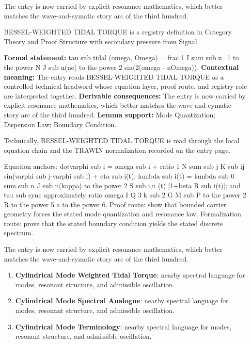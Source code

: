 The entry is now carried by explicit resonance mathematics, which better matches the wave-and-cymatic story arc of the third hundred.
\clearpage


\begingroup\small
{}
BESSEL-WEIGHTED TIDAL TORQUE is a registry definition in Category Theory and Proof Structure with secondary pressure from Signal.

\begingroup\footnotesize\setlength{\emergencystretch}{3em}\sloppy
\textbf{Formal statement:} tau sub tidal (omega, Omega) = frac 1 I sum sub n=1 to the power N J sub n(ne) to the power 2 sin(2(omega - nOmega)). \textbf{Contextual meaning:} The entry reads BESSEL-WEIGHTED TIDAL TORQUE as a controlled technical headword whose equation layer, proof route, and registry role are interpreted together. \textbf{Derivable consequences:} The entry is now carried by explicit resonance mathematics, which better matches the wave-and-cymatic story arc of the third hundred. \textbf{Lemma support:} Mode Quantization; Dispersion Law; Boundary Condition.\par
\endgroup

Technically, BESSEL-WEIGHTED TIDAL TORQUE is read through the local equation chain and the TRAWIN normalization recorded on the entry page.

Equation anchors: dotvarphi sub i = omega sub i + ratio 1 N sum sub j K sub ij sin(varphi sub j-varphi sub i) + eta sub i(t); lambda sub i(t) = lambda sub 0 sum sub n J sub n(kappa) to the power 2 S sub i,n (t) [1+beta R sub i(t)]; and tau sub sync approximately ratio omega I Q 3 k sub 2 G M sub P to the power 2 R to the power 5 a to the power 6. Proof route: show that bounded carrier geometry forces the stated mode quantization and resonance law. Formalization route: prove that the stated boundary condition yields the stated discrete spectrum.

The entry is now carried by explicit resonance mathematics, which better matches the wave-and-cymatic story arc of the third hundred.
\endgroup

\begin{enumerate}[leftmargin=1.6em,itemsep=6pt,topsep=4pt]
\item \textbf{Cylindrical Mode Weighted Tidal Torque}: nearby spectral language for modes, resonant structure, and admissible oscillation.
\item \textbf{Cylindrical Mode Spectral Analogue}: nearby spectral language for modes, resonant structure, and admissible oscillation.
\item \textbf{Cylindrical Mode Terminology}: nearby spectral language for modes, resonant structure, and admissible oscillation.
\end{enumerate}

